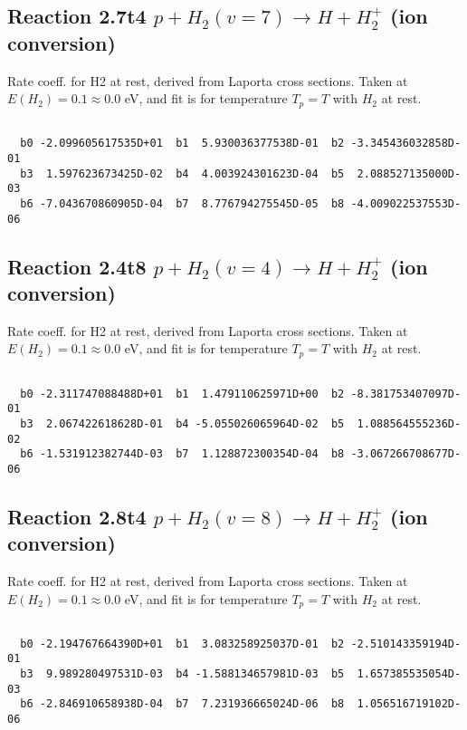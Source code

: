 \documentclass[12pt,dvipdfmx]{article}
\begin{document}
\newpage
\subsection{
Reaction 2.7t4
$ p + H_2(v=7) \rightarrow H + H_2^+$ (ion conversion)
}
Rate coeff. for H2 at rest, derived from Laporta cross sections.
Taken at $E(H_2) = 0.1 \approx 0.0$ eV,  and fit is for temperature $T_p=T$ with $H_2$ at rest.

\begin{small}\begin{verbatim}

  b0 -2.099605617535D+01  b1  5.930036377538D-01  b2 -3.345436032858D-01
  b3  1.597623673425D-02  b4  4.003924301623D-04  b5  2.088527135000D-03
  b6 -7.043670860905D-04  b7  8.776794275545D-05  b8 -4.009022537553D-06

\end{verbatim}\end{small}

\newpage
\subsection{
Reaction 2.4t8
$ p + H_2(v=4) \rightarrow H + H_2^+$ (ion conversion)
}
Rate coeff. for H2 at rest, derived from Laporta cross sections.
Taken at $E(H_2) = 0.1 \approx 0.0$ eV,  and fit is for temperature $T_p=T$ with $H_2$ at rest.

\begin{small}\begin{verbatim}

  b0 -2.311747088488D+01  b1  1.479110625971D+00  b2 -8.381753407097D-01
  b3  2.067422618628D-01  b4 -5.055026065964D-02  b5  1.088564555236D-02
  b6 -1.531912382744D-03  b7  1.128872300354D-04  b8 -3.067266708677D-06

\end{verbatim}\end{small}

\newpage
\subsection{
Reaction 2.8t4
$ p + H_2(v=8) \rightarrow H + H_2^+$ (ion conversion)
}
Rate coeff. for H2 at rest, derived from Laporta cross sections.
Taken at $E(H_2) = 0.1 \approx 0.0$ eV,  and fit is for temperature $T_p=T$ with $H_2$ at rest.

\begin{small}\begin{verbatim}

  b0 -2.194767664390D+01  b1  3.083258925037D-01  b2 -2.510143359194D-01
  b3  9.989280497531D-03  b4 -1.588134657981D-03  b5  1.657385535054D-03
  b6 -2.846910658938D-04  b7  7.231936665024D-06  b8  1.056516719102D-06

\end{verbatim}\end{small}
\end{document}
